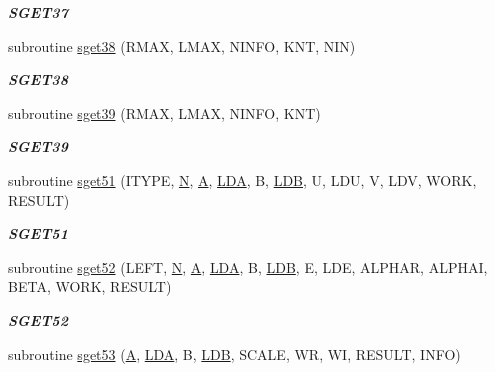 \begin{DoxyCompactItemize}
\begin{DoxyCompactList}\small\item\em {\bfseries S\+G\+E\+T37} \end{DoxyCompactList}\item 
subroutine \hyperlink{group__single__eig_ga15b379af6192edfd74986d7ef1b2e822}{sget38} (R\+M\+A\+X, L\+M\+A\+X, N\+I\+N\+F\+O, K\+N\+T, N\+I\+N)
\begin{DoxyCompactList}\small\item\em {\bfseries S\+G\+E\+T38} \end{DoxyCompactList}\item 
subroutine \hyperlink{group__single__eig_gada7ad6b7b5fd36f8101d62c7b3d378dc}{sget39} (R\+M\+A\+X, L\+M\+A\+X, N\+I\+N\+F\+O, K\+N\+T)
\begin{DoxyCompactList}\small\item\em {\bfseries S\+G\+E\+T39} \end{DoxyCompactList}\item 
subroutine \hyperlink{group__single__eig_gac817155b9a60030bdc313807c2a10f76}{sget51} (I\+T\+Y\+P\+E, \hyperlink{polmisc_8c_a0240ac851181b84ac374872dc5434ee4}{N}, \hyperlink{classA}{A}, \hyperlink{example__user_8c_ae946da542ce0db94dced19b2ecefd1aa}{L\+D\+A}, B, \hyperlink{example__user_8c_a50e90a7104df172b5a89a06c47fcca04}{L\+D\+B}, U, L\+D\+U, V, L\+D\+V, W\+O\+R\+K, R\+E\+S\+U\+L\+T)
\begin{DoxyCompactList}\small\item\em {\bfseries S\+G\+E\+T51} \end{DoxyCompactList}\item 
subroutine \hyperlink{group__single__eig_gaccd03e1eb309d22da705f8bd9a6b0b61}{sget52} (L\+E\+F\+T, \hyperlink{polmisc_8c_a0240ac851181b84ac374872dc5434ee4}{N}, \hyperlink{classA}{A}, \hyperlink{example__user_8c_ae946da542ce0db94dced19b2ecefd1aa}{L\+D\+A}, B, \hyperlink{example__user_8c_a50e90a7104df172b5a89a06c47fcca04}{L\+D\+B}, E, L\+D\+E, A\+L\+P\+H\+A\+R, A\+L\+P\+H\+A\+I, B\+E\+T\+A, W\+O\+R\+K, R\+E\+S\+U\+L\+T)
\begin{DoxyCompactList}\small\item\em {\bfseries S\+G\+E\+T52} \end{DoxyCompactList}\item 
subroutine \hyperlink{group__single__eig_ga5fa2eab03c0b6a8a406b804107622c1f}{sget53} (\hyperlink{classA}{A}, \hyperlink{example__user_8c_ae946da542ce0db94dced19b2ecefd1aa}{L\+D\+A}, B, \hyperlink{example__user_8c_a50e90a7104df172b5a89a06c47fcca04}{L\+D\+B}, S\+C\+A\+L\+E, W\+R, W\+I, R\+E\+S\+U\+L\+T, I\+N\+F\+O)

\end{DoxyCompactItemize}
